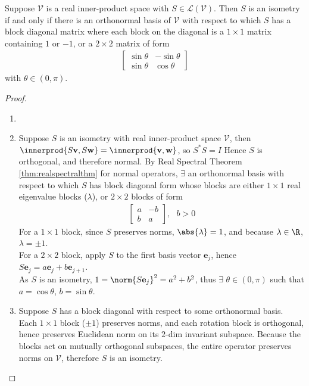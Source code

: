 \begin{theorem} Suppose $\mathcal{V}$ is a real inner-product space with $S \in \mathcal{L}(\mathcal{V})$. Then $S$ is an isometry if and only if there is an orthonormal basis of $\mathcal{V}$ with respect to which $S$ has a block diagonal matrix where each block on the diagonal is a $1 \times 1$ matrix containing $1$ or $-1$, or a $2 \times 2$ matrix of form
\begin{align}
\begin{bmatrix}
\sin \theta & - \sin \theta \\
\sin \theta & \cos \theta
\end{bmatrix} \nonumber
\end{align}
with $\theta \in (0, \pi)$.
\begin{proof} 
\begin{enumerate}[label=\roman*.]
\setlength{\itemsep}{0pt}
\item[]
\item[$(\Rightarrow)$] Suppose $S$ is an isometry with real inner-product space $\mathcal{V}$, then $\innerprod{S \mathbf{v}, S \mathbf{w}} = \innerprod{\mathbf{v}, \mathbf{w}}$, so $S^* S = I$ Hence $S$ is orthogonal, and therefore normal. By Real Spectral Theorem \ref{thm:realspectralthm} for normal operators, $\exists$ an orthonormal basis with respect to which $S$ has block diagonal form whose blocks are either $1 \times 1$ real eigenvalue blocks ($\lambda$), or $2 \times 2$ blocks of form
\begin{align}
\begin{bmatrix}
a & -b \\
b & a
\end{bmatrix}, \ \ \ b > 0 \nonumber
\end{align}
For a $1 \times 1$ block, since $S$ preserves norms, $\abs{\lambda} = 1$, and because $\lambda \in \R$, $\lambda = \pm 1$.\\
For a $2 \times 2$ block, apply $S$ to the first basis vector $\mathbf{e}_j$, hence $S \mathbf{e}_j = a \mathbf{e}_j + b \mathbf{e}_{j+1}$.\\
As $S$ is an isometry, $1 = \norm{S \mathbf{e}_j}^2 = a^2 + b^2$, thus $\exists$ $\theta \in (0, \pi)$ such that $a = \cos \theta$, $b = \sin \theta$.
\item[$(\Leftarrow)$] Suppose $S$ has a block diagonal with respect to some orthonormal basis.\\
Each $1 \times 1$ block ($\pm 1$) preserves norms, and each rotation block is orthogonal, hence preserves Euclidean norm on its $2$-dim invariant subspace. Because the blocks act on mutually orthogonal subspaces, the entire operator preserves norms on $\mathcal{V}$, therefore $S$ is an isometry.
\end{enumerate}
\end{proof}
\end{theorem}

